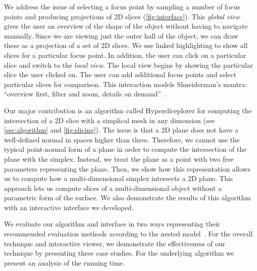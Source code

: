 We address the issue of selecting a focus point by sampling a number of focus
points and producing projections of 2D slices (\autoref{fig:interface}). This
\emph{global view} gives the user an overview of the shape of the object
without having to navigate manually. Since we are viewing just
the outer hull of the object, we can draw these as a projection of a set of 2D
slices.  We use linked highlighting to show all slices for a particular focus
point.  In addition, the user can click on a particular slice and switch to the
\emph{local view}. The local view begins by showing the particular slice the
user clicked on. The user can add additional focus points and select particular
slices for comparison. This interaction models Shneiderman's mantra: ``overview
first, filter and zoom, details on demand''~\cite{Shneiderman:1996}.

Our major contribution is an
algorithm called Hypersliceplorer for computing the intersection of a 2D slice with a simplical
mesh in any dimension (see \autoref{sec:algorithm} and \autoref{fig:slicing}). The issue is that a 2D plane does not have a
well-defined normal in spaces higher than three. Therefore, we cannot
use the typical point-normal form of a plane in order to compute the
intersection of the plane with the simplex. Instead, we treat the plane
as a point with two free parameters representing the plane. Then, we
show how this representation allows us to compute how a
multi-dimensional simplex intersects a 2D plane. This approach lets us compute
slices of a multi-dimensional object without a parametric form of the
surface. We also demonstrate the results of this algorithm with an interactive
interface we developed.

We evaluate our algorithm and interface in two ways representing their recommended
evaluation methods according to the nested
model~\cite{Munzner:2009}. For the overall technique and
interactive viewer, we demonstrate the effectiveness of our technique by
presenting three case studies. For the underlying algorithm we present an
analysis of the running time. 

